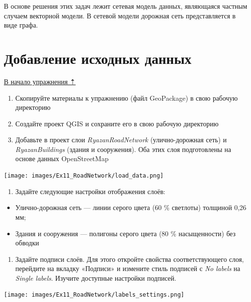 \documentclass[
  12pt,
]{book}
\providecommand{\tightlist}{%
  \setlength{\itemsep}{0pt}\setlength{\parskip}{0pt}}
\begin{document}
В основе решения этих задач лежит сетевая модель данных, являющаяся частным случаем векторной модели. В сетевой модели дорожная сеть представляется в виде графа.

\hypertarget{networks-init}{%
\section{Добавление исходных данных}\label{networks-init}}

\protect\hyperlink{networks}{В начало упражнения ⇡}

\begin{enumerate}
\def\labelenumi{\arabic{enumi}.}
\item
  Скопируйте материалы к упражнению (файл GeoPackage) в свою рабочую директорию
\item
  Создайте проект QGIS и сохраните его в свою рабочую директорию
\item
  Добавьте в проект слои \emph{RyazanRoadNetwork} (улично-дорожная сеть) и \emph{RyazanBuildings} (здания и сооружения). Оба этих слоя подготовлены на основе данных OpenStreetMap
\end{enumerate}

\texttt{[image: images/Ex11\_RoadNetwork/load\_data.png]}

\begin{enumerate}
\def\labelenumi{\arabic{enumi}.}
\setcounter{enumi}{3}
\tightlist
\item
  Задайте следующие настройки отображения слоёв:
\end{enumerate}

\begin{itemize}
\tightlist
\item
  Улично-дорожная сеть --- линии серого цвета (60 \% светлоты) толщиной 0,26 мм;
\item
  Здания и сооружения --- полигоны серого цвета (80 \% насыщенности) без обводки
\end{itemize}

\begin{enumerate}
\def\labelenumi{\arabic{enumi}.}
\setcounter{enumi}{4}
\tightlist
\item
  Задайте подписи слоёв. Для этого откройте свойства соответствующего слоя, перейдите на вкладку «Подписи» и измените стиль подписей с \emph{No labels} на \emph{Single labels}. Изучите доступные настройки подписей.
\end{enumerate}

\texttt{[image: images/Ex11\_RoadNetwork/labels\_settings.png]}
\end{document}
